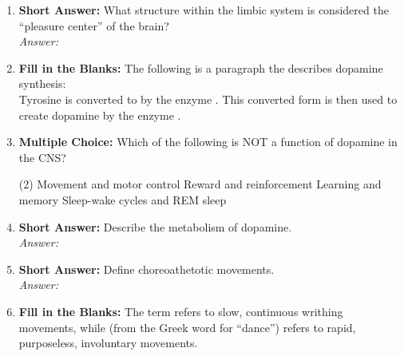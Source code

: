 \begin{enumerate}[label=\textbf{Q3.5.\arabic*}]
    \item \textbf{Short Answer:} What structure within the limbic system is considered the ``pleasure center'' of the brain? \\
        \textit{Answer:} \\%

    \item \textbf{Fill in the Blanks:} The following is a paragraph the describes dopamine synthesis: \\
    Tyrosine is converted to \underline{\hspace{3cm}} by the enzyme \underline{\hspace{3cm}}. This converted form is then used to create dopamine by the enzyme \underline{\hspace{3cm}}. 
        
    \item \textbf{Multiple Choice:} Which of the following is NOT a function of dopamine in the CNS?
        \begin{tasks}[label=\textcolor{\documentTheme}{(\Alph*)}, item-format=\color{\documentTheme}, label-width=1.5em, item-indent=1.7em](2)
            \task Movement and motor control
            \task Reward and reinforcement
            \task Learning and memory
            \task Sleep-wake cycles and REM sleep
        \end{tasks}

    \item \textbf{Short Answer:} Describe the metabolism of dopamine. \\ 
        \textit{Answer:} \\ %
    \item \textbf{Short Answer:} Define choreoathetotic movements. \\
        \textit{Answer:} \\%

    \item \textbf{Fill in the Blanks:} The term \underline{\hspace{3cm}} refers to slow, continuous writhing movements, while \underline{\hspace{3cm}} (from the Greek word for ``dance'') refers to rapid, purposeless, involuntary movements.


\end{enumerate}
